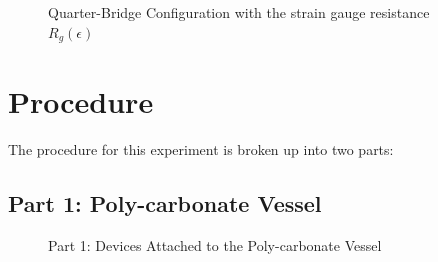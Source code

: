 \documentclass{article}
\begin{document}
\begin{itemize}
\begin{figure}[H]
    \centering
    \hypertarget{Fig1}{}
    \caption{Quarter-Bridge Configuration with the strain gauge resistance $R_{g}(\epsilon)$}
\end{figure}
\end{itemize}
\pagebreak

\section{Procedure}
The procedure for this experiment is broken up into two parts:
\subsection{Part 1: Poly-carbonate Vessel}
\begin{figure}[H]
    \centering
    \caption{Part 1: Devices Attached to the Poly-carbonate Vessel}
\end{figure}
\end{document}
